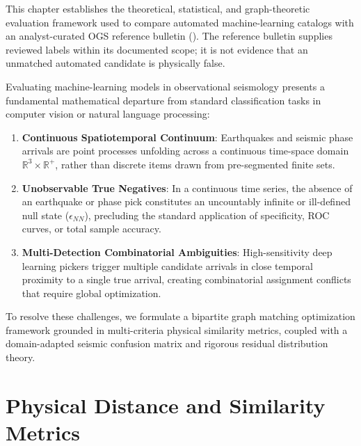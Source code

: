 
\label{chap:methodology}

This chapter establishes the theoretical, statistical, and graph-theoretic evaluation framework used to compare automated machine-learning catalogs with an analyst-curated OGS reference bulletin (\cite{SMINO}). The reference bulletin supplies reviewed labels within its documented scope; it is not evidence that an unmatched automated candidate is physically false.

Evaluating machine-learning models in observational seismology presents a fundamental mathematical departure from standard classification tasks in computer vision or natural language processing:
\begin{enumerate}
  \item \textbf{Continuous Spatiotemporal Continuum}: Earthquakes and seismic phase arrivals are point processes unfolding across a continuous time-space domain $\mathbb{R}^3 \times \mathbb{R}^+$, rather than discrete items drawn from pre-segmented finite sets.
  \item \textbf{Unobservable True Negatives}: In a continuous time series, the absence of an earthquake or phase pick constitutes an uncountably infinite or ill-defined null state ($\epsilon_{NN}$), precluding the standard application of specificity, ROC curves, or total sample accuracy.
  \item \textbf{Multi-Detection Combinatorial Ambiguities}: High-sensitivity deep learning pickers trigger multiple candidate arrivals in close temporal proximity to a single true arrival, creating combinatorial assignment conflicts that require global optimization.
\end{enumerate}

To resolve these challenges, we formulate a bipartite graph matching optimization framework grounded in multi-criteria physical similarity metrics, coupled with a domain-adapted seismic confusion matrix and rigorous residual distribution theory.

\section{Physical Distance and Similarity Metrics}
\label{sec:distance_metrics}

